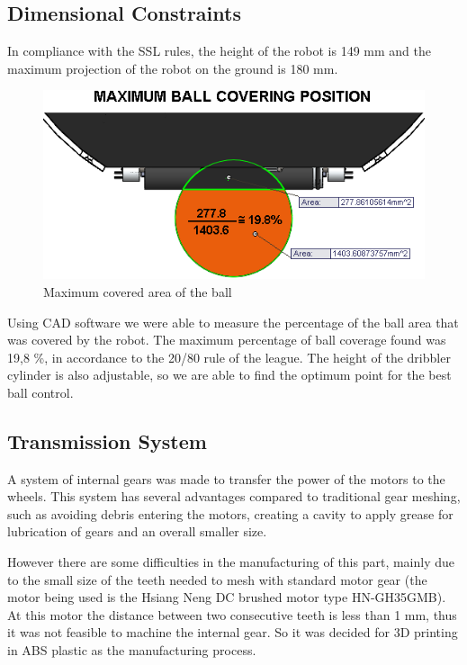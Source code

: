 \subsection{Dimensional Constraints}

In compliance with the SSL rules, the height of the robot is 149 mm and the maximum projection of the robot on the ground is 180 mm.

\begin{figure}[!htb]
	\centering
	\includegraphics[width = 0.8 \textwidth]{img/20-80_rule.png}
	\caption[]{Maximum covered area of the ball}
\end{figure}

Using CAD software we were able to measure the percentage of the ball area that was covered by the robot. The maximum percentage of ball coverage found was 19,8 \%, in accordance to the 20/80 rule of the league. The height of the dribbler cylinder is also adjustable, so we are able to find the optimum point for the best ball control. 

\subsection{Transmission System}

A system of internal gears was made to transfer the power of the motors to the wheels. This system has several advantages compared to traditional gear meshing, such as avoiding debris entering the motors, creating a cavity to apply grease for lubrication of gears and an overall smaller size.

However there are some difficulties in the manufacturing of this part, mainly due to the small size of the teeth needed to mesh with standard motor gear (the motor being used is the Hsiang Neng DC brushed motor type HN-GH35GMB). At this motor the distance between two consecutive teeth is less than 1 mm, thus it was not feasible to machine the internal gear. So it was decided for 3D printing in ABS plastic as the manufacturing process.

